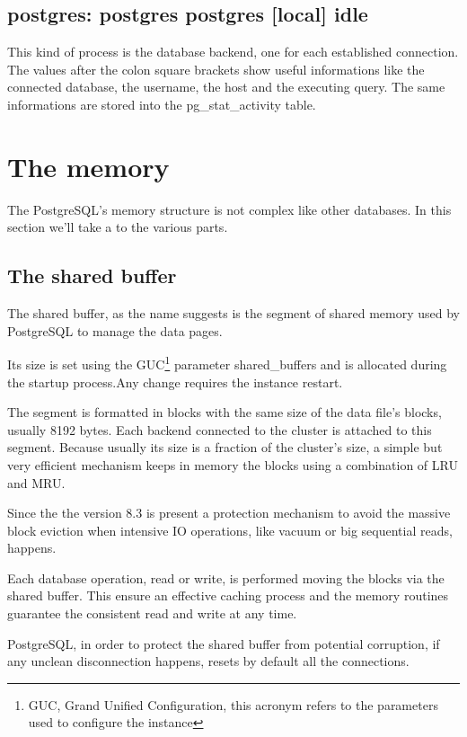 \subsection{postgres: postgres postgres [local] idle}
This kind of process is the database backend, one for each established 
connection. The values after the colon square brackets show useful 
informations like the connected database, the username, the host and the 
executing query. The same informations are stored into the pg\_stat\_activity 
table.


\section{The memory}
\label{sec:MEMORY}
The PostgreSQL's memory structure is not complex like other databases.
In this section we'll take a to the various parts. 

\subsection{The shared buffer}
The shared buffer, as the name suggests is the segment of shared memory used by 
PostgreSQL to manage the data pages. 

Its size is set using the GUC\footnote{GUC, Grand Unified Configuration, this 
acronym refers to the parameters used to configure the instance} parameter 
shared\_buffers and is allocated 
during the startup process.Any change requires the instance restart.

The segment is formatted in blocks with the same size of the data file's 
blocks, usually 8192 bytes. Each backend connected to the cluster is attached 
to this segment. Because usually its size is a fraction of the cluster's size, 
a simple but very efficient mechanism keeps in memory the blocks using a 
combination of LRU and MRU.

Since the the version 8.3 is present a protection mechanism to avoid the 
massive block eviction when intensive IO operations, like vacuum or big 
sequential reads, happens.

Each database operation, read or write, is performed moving the blocks via the 
shared buffer. This ensure an effective caching process and the memory routines 
guarantee the consistent read and write at any time.

PostgreSQL, in order to protect the shared buffer from potential corruption, if 
any unclean disconnection happens, resets by default all the connections. 

